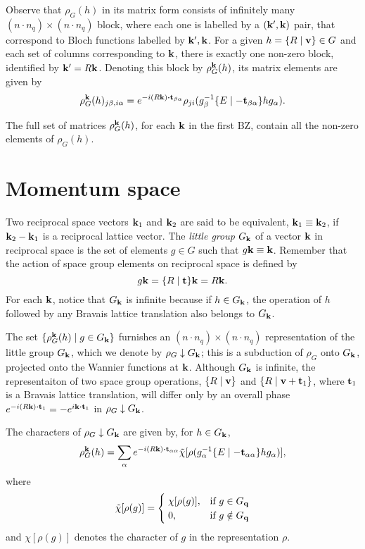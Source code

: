 Observe that $\rho_G(h)$ in its matrix form consists of infinitely many $(n\cdot n_q)\times (n\cdot n_q)$ block, where each one is labelled by a $({\vb{k}}', {\vb{k}})$ pair, that correspond to Bloch functions labelled by ${\vb{k}}', {\vb{k}}$. For a given $h = \{ R \mid {\vb{v}} \} \in G$ and each set of columns corresponding to ${\vb{k}}$, there is exactly one non-zero block, identified by ${\vb{k}}' = R{\vb{k}}$. Denoting this block by $\rho_G^{\vb{k}}(h)$, its matrix elements are given by
$$
\rho_G^\k(h)_{j\beta,i\alpha} = e^{-i(R\k)\vdot\t_{\beta\alpha}}\rho_{ji}(g_\beta^{-1}\sg{E}{-\t_{\beta\alpha}}hg_\alpha).
$$

The full set of matrices $\rho_G^{\vb{k}}(h)$, for each ${\vb{k}}$ in the first BZ, contain all the non-zero elements of $\rho_G(h)$.

\section{Momentum space}

\begin{definition}
Two reciprocal space vectors ${\vb{k}}_1$ and ${\vb{k}}_2$ are said to be equivalent, ${\vb{k}}_1 \equiv {\vb{k}}_2$, if ${\vb{k}}_2 - {\vb{k}}_1$ is a reciprocal lattice vector. The \textit{little group} $G_{\vb{k}}$ of a vector ${\vb{k}}$ in reciprocal space is the set of elements $g \in G$ such that $g {\vb{k}} \equiv {\vb{k}}$. Remember that the action of space group elements on reciprocal space is defined by
$$
g{\vb{k}} = \{ R \mid {\vb{t}} \}{\vb{k}} = R{\vb{k}}.
$$
For each ${\vb{k}}$, notice that $G_{\vb{k}}$ is infinite because if $h \in G_{\vb{k}}$, the operation of $h$ followed by any Bravais lattice translation also belongs to $G_{\vb{k}}$.
\end{definition}

\n

The set $\{\rho_G^{\vb{k}}(h) \mid g \in G_{\vb{k}}\}$ furnishes an $(n\cdot n_q)\times(n\cdot n_q)$ representation of the little group $G_{\vb{k}}$, which we denote by $\rho_G \downarrow G_{\vb{k}}$; this is a subduction of $\rho_G$ onto $G_{\vb{k}}$, projected onto the Wannier functions at ${\vb{k}}$. Although $G_{\vb{k}}$ is infinite, the representaiton of two space group operations, $\{ R \mid {\vb{v}} \}$ and $\{ R \mid {\vb{v}}+{\vb{t}}_1 \}$, where ${\vb{t}}_1$ is a Bravais lattice translation, will differ only by an overall phase $e^{-i(R\k)\vdot\t_1} = -e^{i\k\vdot\t_1}$ in $\rho_G \downarrow G_{\vb{k}}$.

\n

The characters of $\rho_G \downarrow G_{\vb{k}}$ are given by, for $h \in G_{\vb{k}}$,
$$
\rho_G^\k(h) =
\sum_{\alpha} e^{-i(R\k)\vdot\t_{\alpha\alpha}}
\tilde{\chi}[\rho(g_\alpha^{-1}\sg{E}{-\t_{\alpha\alpha}}h g_\alpha)],
$$
where
\begin{align} \label{eq:tilde_chi}
\tilde{\chi}[\rho(g)] =
\begin{cases}
\; \chi[\rho(g)], & \text{if } g \in G_{\vb{q}} \\
\; 0, & \text{if } g \notin G_{\vb{q}}
\end{cases}
\end{align}
and $\chi[\rho(g)]$ denotes the character of $g$ in the representation $\rho$.

